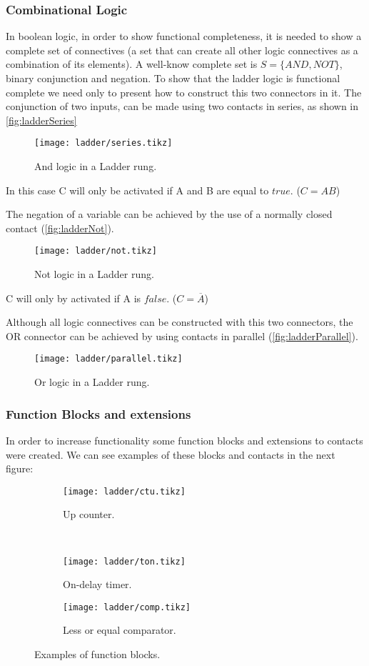 \subsubsection{Combinational Logic}
In boolean logic, in order to show functional completeness, it is needed to show a
complete set of connectives (a set that can create all other logic connectives
as a combination of its elements). A well-know complete set is $S=\{AND,NOT\}$,
binary conjunction and negation.
To show that the ladder logic is functional complete we need only to present how
to construct this two connectors in it.
The conjunction of two inputs, can be made using two contacts in series, as
shown in \autoref{fig:ladderSeries}
\begin{figure}[H]
  \centering \texttt{[image: ladder/series.tikz]}
  \caption{And logic in a Ladder rung.}
  \label{fig:ladderSeries}
\end{figure}
In this case C will only be activated if A and B are equal to $true$. ($C=AB$)

The negation of a variable can be achieved by the use of a normally closed
contact (\autoref{fig:ladderNot}).
\begin{figure}[H]
  \centering \texttt{[image: ladder/not.tikz]}
  \caption{Not logic in a Ladder rung.}
  \label{fig:ladderNot}
\end{figure}
C will only by activated if A is $false$. ($C=\overline{A}$)

Although all logic connectives can be constructed with this two connectors, the
OR connector can be achieved by using contacts in parallel (\autoref{fig:ladderParallel}).
\begin{figure}[H]
  \centering \texttt{[image: ladder/parallel.tikz]}
  \caption{Or logic in a Ladder rung.}
  \label{fig:ladderParallel}
\end{figure}



\subsubsection{Function Blocks and extensions}
In order to increase functionality some function blocks and 
extensions to contacts were created. We can see examples of these blocks and
contacts in the next figure:

\begin{figure}[H]
   \centering
\begin{subfigure}[t]{0.45\textwidth}
  \centering \texttt{[image: ladder/ctu.tikz]}
  \caption{Up counter.}
  \label{fig:ctu}
\end{subfigure}
~
\begin{subfigure}[t]{0.45\textwidth}
  \centering \texttt{[image: ladder/ton.tikz]}
  \caption{On-delay timer.}
  \label{fig:ton}
\end{subfigure}

\begin{subfigure}[t]{0.45\textwidth}
  \centering \texttt{[image: ladder/comp.tikz]}
  \caption{Less or equal comparator.}
  \label{fig:comp}
\end{subfigure}
  \caption{Examples of function blocks.}
  \label{fig:functionBlocks}
\end{figure}

